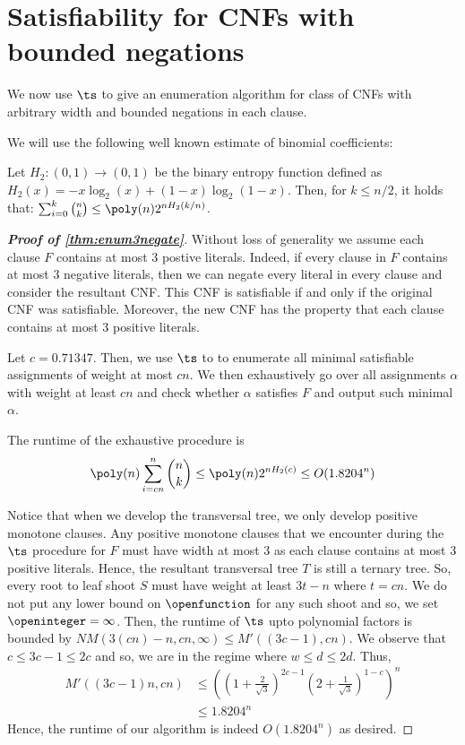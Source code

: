 \section{Satisfiability for CNFs with bounded negations} \label{sec:satboundedneg}

We now use $\ts$ to give an enumeration algorithm for class of CNFs with arbitrary width and bounded negations in each clause.

We will use the following well known estimate of binomial coefficients:
\begin{proposition}
Let $H_2: (0, 1) \rightarrow (0, 1)$ be the binary entropy function defined as $H_2(x) = -x \log_2(x) + (1-x) \log_2(1-x)$. Then, for $k\le n / 2$, it holds that: $\sum_{i = 0}^k\binom{n}{k} \le \poly(n) 2^{n H_2(k / n)}$.
\end{proposition}

\begin{proof}[\textbf{Proof of \cref{thm:enum3negate}}]
Without loss of generality we assume each clause $F$ contains at most $3$ postive literals. Indeed, if every clause in $F$ contains at most $3$ negative literals, then we can negate every literal in every clause and consider the resultant CNF. This CNF is satisfiable if and only if the original CNF was satisfiable. Moreover, the new CNF has the property that each clause contains at most $3$ positive literals.

Let $c = 0.71347$.
Then, we use $\ts$ to to enumerate all minimal satisfiable assignments of weight at most $cn$. We then exhaustively go over all assignments $\alpha$ with weight at least $cn$ and check whether $\alpha$ satisfies $F$ and output such minimal $\alpha$.

The runtime of the exhaustive procedure is
\[
	\poly(n)\sum_{i=cn}^n \binom{n}{k} \le \poly(n) 2^{n H_2(c)} \le O(1.8204^n)
\]

Notice that when we develop the transversal tree, we only develop positive monotone clauses. Any positive monotone clauses that we encounter during the $\ts$ procedure for $F$ must have width at most $3$ as each clause contains at most $3$ positive literals. Hence, the resultant transversal tree $T$ is still a ternary tree. So, every root to leaf shoot $S$ must have weight at least $3t - n$ where $t = cn$. We do not put any lower bound on $\openfunction$ for any such shoot and so, we set $\openinteger = \infty$. Then, the runtime of $\ts$ upto polynomial factors is bounded by $NM(3(cn) - n, cn, \infty) \le M'((3c-1), cn)$. We observe that $c\le 3c-1 \le 2c$ and so, we are in the regime where $w\le d\le 2d$. Thus, 
\begin{align*}
M'((3c-1)n, cn)
& \le \left(\left( 1 + \frac{2}{\sqrt{3}}\right)^{2c-1}\left(2 + \frac{1}{\sqrt{3}}\right)^{1-c}\right)^n\\
& \le 1.8204^n
\end{align*}
Hence, the runtime of our algorithm is indeed $O(1.8204^n)$ as desired.

\end{proof}

